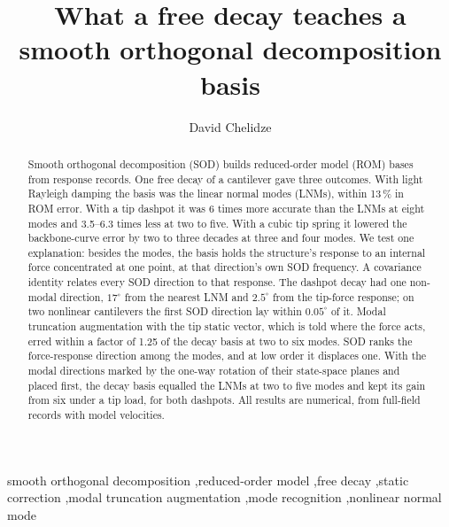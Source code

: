 \documentclass[preprint,12pt]{elsarticle}
\begin{document}
\begin{frontmatter}
\title{What a free decay teaches a smooth orthogonal decomposition basis}
\author[nld]{David Chelidze}


\begin{abstract}
Smooth orthogonal decomposition (SOD) builds reduced-order model (ROM) bases from response records. One free decay of a cantilever gave three outcomes.
With light Rayleigh damping the basis was the linear normal modes (LNMs), within 13\,\% in ROM error.
With a tip dashpot it was 6 times more accurate than the LNMs at eight modes and 3.5--6.3 times less at two to five.
With a cubic tip spring it lowered the backbone-curve error by two to three decades at three and four modes.
We test one explanation: besides the modes, the basis holds the structure's response to an internal force concentrated at one point, at that direction's own SOD frequency.
A covariance identity relates every SOD direction to that response.
The dashpot decay had one non-modal direction, $17^\circ$ from the nearest LNM and $2.5^\circ$ from the tip-force response; on two nonlinear cantilevers the first SOD direction lay within $0.05^\circ$ of it.
Modal truncation augmentation with the tip static vector, which is told where the force acts, erred within a factor of 1.25 of the decay basis at two to six modes.
SOD ranks the force-response direction among the modes, and at low order it displaces one.
With the modal directions marked by the one-way rotation of their state-space planes and placed first, the decay basis equalled the LNMs at two to five modes and kept its gain from six under a tip load, for both dashpots.
All results are numerical, from full-field records with model velocities.
\end{abstract}

\begin{keyword}
smooth orthogonal decomposition \sep reduced-order model \sep free decay \sep static correction \sep modal truncation augmentation \sep mode recognition \sep nonlinear normal mode
\end{keyword}
\end{frontmatter}
\end{document}
